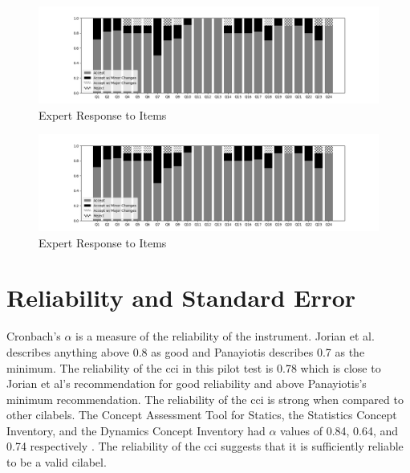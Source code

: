 \iflong
\begin{figure}[!htbp]
    \begin{center}
    \advance\leftskip-3cm
    \advance\rightskip-3cm
    \includegraphics[scale=.5]{images/bar.png}
    \caption{Expert Response to Items}
    \label{fig:accept_rej}
\end{center}
\end{figure}
\fi

\ifshort
\begin{figure}[!htbp]
    \begin{center}
    \advance\leftskip-3cm
    \advance\rightskip-3cm
    \includegraphics[scale=.3]{images/bar.png}
    \caption{Expert Response to Items}
    \label{fig:accept_rej}
\end{center}
\end{figure}
\fi

\FloatBarrier
\section{Reliability and Standard Error}

Cronbach's $\alpha$ is a measure of the reliability of the instrument. Jorian et al. \cite{jorian} describes anything above 0.8 as good and Panayiotis \cite{panayiotis} describes 0.7 as the minimum. The reliability of the \gls{cci} in this pilot test is 0.78 which is close to Jorian et al's recommendation for good reliability and above Panayiotis's minimum recommendation. The reliability of the \gls{cci} is strong when compared to other \glspl{cilabel}. The Concept Assessment Tool for Statics, the Statistics Concept Inventory, and the Dynamics Concept Inventory had $\alpha$ values of 0.84, 0.64, and 0.74 respectively \cite{jorian}. The reliability of the \gls{cci} suggests that it is sufficiently reliable to be a valid \gls{cilabel}.

